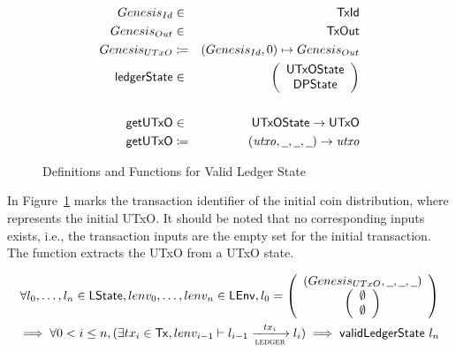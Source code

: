 \begin{figure}[ht]
  \centering
  \begin{align*}
    \genesisId & \in & \TxId \\
    \genesisTxOut & \in & \TxOut \\
    \genesisUTxO & \coloneqq & (\genesisId, 0) \mapsto \genesisTxOut
    \\
    \ledgerState & \in & \left(
                         \begin{array}{c}
                           \UTxOState \\
                           \DPState
                         \end{array}
    \right)\\
               && \\
    \fun{getUTxO} & \in & \UTxOState \to \UTxO \\
    \fun{getUTxO} & \coloneqq & (\var{utxo}, \wcard, \wcard, \wcard) \to \var{utxo}
  \end{align*}
  \caption{Definitions and Functions for Valid Ledger State}
  \label{fig:valid-ledger}
\end{figure}

In Figure~\ref{fig:valid-ledger} \genesisId{} marks the transaction identifier
of the initial coin distribution, where \genesisTxOut{} represents the initial
UTxO. It should be noted that no corresponding inputs exists, i.e., the
transaction inputs are the empty set for the initial transaction. The function
 extracts the UTxO from a UTxO state.

\begin{definition}
  \begin{multline*}
    \forall l_{0},\ldots,l_{n} \in \LState, lenv_{0},\ldots,lenv_{n} \in \LEnv,
    l_{0} = \left(
      \begin{array}{c}
        \genesisUTxOState \\
        \left(
        \begin{array}{c}
          \emptyset\\
          \emptyset
        \end{array}
        \right)
      \end{array}
    \right)  \\
    \implies \forall 0 < i \leq n, (\exists tx_{i} \in \Tx,
    lenv_{i-1}\vdash l_{i-1} \trans{ledger}{tx_{i}} l_{i}) \implies
    \applyFun{validLedgerState} l_{n}
  \end{multline*}
  \label{def:valid-ledger-state}
\end{definition}

